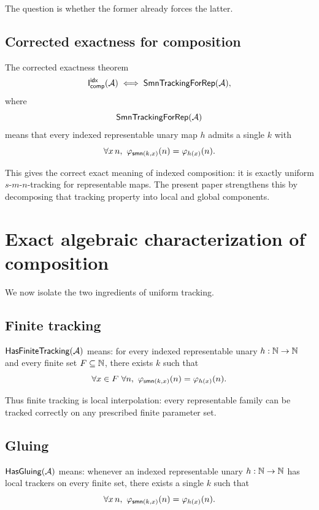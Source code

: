\documentclass[11pt]{article}
\begin{document}
The question is whether the former already forces the latter.

\subsection{Corrected exactness for composition}

The corrected exactness theorem
\[
\mathsf{I}_{\mathsf{comp}}^{\mathsf{idx}}(\mathcal{A}) \;\Longleftrightarrow\; \mathsf{SmnTrackingForRep}(\mathcal{A}),
\]
where
\[
\mathsf{SmnTrackingForRep}(\mathcal{A})
\]
means that every indexed representable unary map \(h\) admits a single \(k\) with
\[
\forall x\,n,\ \phiaps_{\smn(k,x)}(n)=\phiaps_{h(x)}(n).
\]

This gives the correct exact meaning of indexed composition: it is exactly uniform \(s\)-\(m\)-\(n\)-tracking for representable maps.  The present paper strengthens this by decomposing that tracking property into local and global components.

\section{Exact algebraic characterization of composition}\label{sec:composition}

We now isolate the two ingredients of uniform tracking.

\subsection{Finite tracking}

\begin{definition}
\(\mathsf{HasFiniteTracking}(\mathcal{A})\) means:
for every indexed representable unary \(h:\mathbb{N}\to\mathbb{N}\) and every finite set \(F \subseteq \mathbb{N}\), there exists \(k\) such that
\[
\forall x\in F\ \forall n,\ \phiaps_{\smn(k,x)}(n)=\phiaps_{h(x)}(n).
\]
\end{definition}

Thus finite tracking is local interpolation: every representable family can be tracked correctly on any prescribed finite parameter set.

\subsection{Gluing}

\begin{definition}[Gluing]
\(\mathsf{HasGluing}(\mathcal{A})\) means:
whenever an indexed representable unary \(h:\mathbb{N}\to\mathbb{N}\) has local trackers on every finite set, there exists a single \(k\) such that
\[
\forall x\,n,\ \phiaps_{\smn(k,x)}(n)=\phiaps_{h(x)}(n).
\]
\end{definition}
\end{document}
